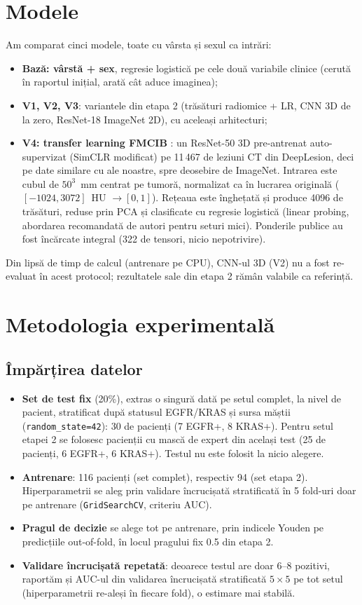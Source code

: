 \documentclass[runningheads,a4paper,11pt]{report}
\begin{document}
\section{Modele}
Am comparat cinci modele, toate cu vârsta și sexul ca intrări:
\begin{itemize}
    \item \textbf{Bază: vârstă + sex}, regresie logistică pe cele două variabile clinice (cerută în raportul inițial, arată cât aduce imaginea);
    \item \textbf{V1, V2, V3}: variantele din etapa 2 (trăsături radiomice + LR, CNN 3D de la zero, ResNet-18 ImageNet 2D), cu aceleași arhitecturi;
    \item \textbf{V4: transfer learning FMCIB} \cite{fmcib}: un ResNet-50 3D pre-antrenat auto-supervizat (SimCLR modificat) pe 11\,467 de leziuni CT din DeepLesion, deci pe date similare cu ale noastre, spre deosebire de ImageNet. Intrarea este cubul de $50^3$~mm centrat pe tumoră, normalizat ca în lucrarea originală ($[-1024, 3072]$~HU $\to [0,1]$). Rețeaua este înghețată și produce 4096 de trăsături, reduse prin PCA și clasificate cu regresie logistică (linear probing, abordarea recomandată de autori pentru seturi mici). Ponderile publice au fost încărcate integral (322 de tensori, nicio nepotrivire).
\end{itemize}
Din lipsă de timp de calcul (antrenare pe CPU), CNN-ul 3D (V2) nu a fost re-evaluat în acest protocol; rezultatele sale din etapa 2 rămân valabile ca referință.

\section{Metodologia experimentală}

\subsection{Împărțirea datelor}
\begin{itemize}
    \item \textbf{Set de test fix} (20\%), extras o singură dată pe setul complet, la nivel de pacient, stratificat după statusul EGFR/KRAS și sursa măștii (\texttt{random\_state=42}): 30 de pacienți (7 EGFR+, 8 KRAS+). Pentru setul etapei 2 se folosesc pacienții cu mască de expert din același test (25 de pacienți, 6 EGFR+, 6 KRAS+). Testul nu este folosit la nicio alegere.
    \item \textbf{Antrenare}: 116 pacienți (set complet), respectiv 94 (set etapa 2). Hiperparametrii se aleg prin validare încrucișată stratificată în 5 fold-uri doar pe antrenare (\texttt{GridSearchCV}, criteriu AUC).
    \item \textbf{Pragul de decizie} se alege tot pe antrenare, prin indicele Youden pe predicțiile out-of-fold, în locul pragului fix 0.5 din etapa 2.
    \item \textbf{Validare încrucișată repetată}: deoarece testul are doar 6--8 pozitivi, raportăm și AUC-ul din validarea încrucișată stratificată $5 \times 5$ pe tot setul (hiperparametrii re-aleși în fiecare fold), o estimare mai stabilă.
\end{itemize}
\end{document}
